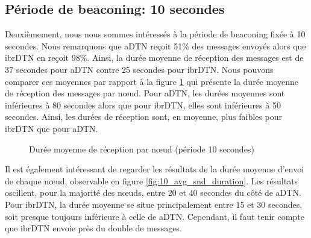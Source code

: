 \documentclass[a4paper,10pt]{article}
\begin{document}
\subsection {Période de beaconing: 10 secondes}
Deuxièmement, nous nous sommes intéressés à la période de beaconing fixée à 10 secondes. Nous remarquons que aDTN reçoit 51\% des messages envoyés alors que ibrDTN en reçoit 98\%. Ainsi, la durée moyenne de réception des messages est de 37 secondes pour aDTN contre 25 secondes pour ibrDTN. Nous pouvons comparer ces moyennes par rapport à la figure \ref{fig:10_avg_rcv_duration} qui présente la durée moyenne de réception des messages par nœud. Pour aDTN, les durées moyennes sont inférieures à 80 secondes alors que pour ibrDTN, elles sont inférieures à 50 secondes. Ainsi, les durées de réception sont, en moyenne, plus faibles pour ibrDTN que pour aDTN.\par

\begin{figure}[h!]
    \centering
    \caption{Durée moyenne de réception par nœud (période 10 secondes)}
    \label{fig:10_avg_rcv_duration}
\end{figure}

Il est également intéressant de regarder les résultats de la durée moyenne d'envoi de chaque nœud, observable en figure \ref{fig:10_avg_snd_duration}. Les résultats oscillent, pour la majorité des nœuds, entre 20 et 40 secondes du côté de aDTN. Pour ibrDTN, la durée moyenne se situe principalement entre 15 et 30 secondes, soit presque toujours inférieure à celle de aDTN. Cependant, il faut tenir compte que ibrDTN envoie près du double de messages. \par
\end{document}
